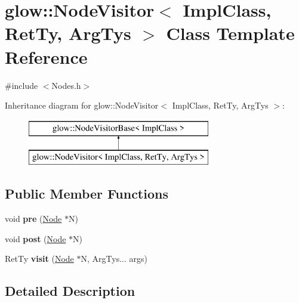 \hypertarget{classglow_1_1_node_visitor}{}\section{glow\+:\+:Node\+Visitor$<$ Impl\+Class, Ret\+Ty, Arg\+Tys $>$ Class Template Reference}
\label{classglow_1_1_node_visitor}


{\ttfamily \#include $<$Nodes.\+h$>$}

Inheritance diagram for glow\+:\+:Node\+Visitor$<$ Impl\+Class, Ret\+Ty, Arg\+Tys $>$\+:\begin{figure}[H]
\begin{center}
\leavevmode
\includegraphics[height=2.000000cm]{classglow_1_1_node_visitor}
\end{center}
\end{figure}
\subsection*{Public Member Functions}
\begin{DoxyCompactItemize}
\item 
\mbox{\label{classglow_1_1_node_visitor_a08f6f60240bd93eb7b836f18c6b37b64}} 
void {\bfseries pre} (\hyperlink{classglow_1_1_node}{Node} $\ast$N)
\item 
\mbox{\label{classglow_1_1_node_visitor_a596d73ed08f72dcc41690ee38a5b9e23}} 
void {\bfseries post} (\hyperlink{classglow_1_1_node}{Node} $\ast$N)
\item 
\mbox{\label{classglow_1_1_node_visitor_ae3ac0777e70e98bdd4fe98d8ba0de10f}} 
Ret\+Ty {\bfseries visit} (\hyperlink{classglow_1_1_node}{Node} $\ast$N, Arg\+Tys... args)
\end{DoxyCompactItemize}


\subsection{Detailed Description}
